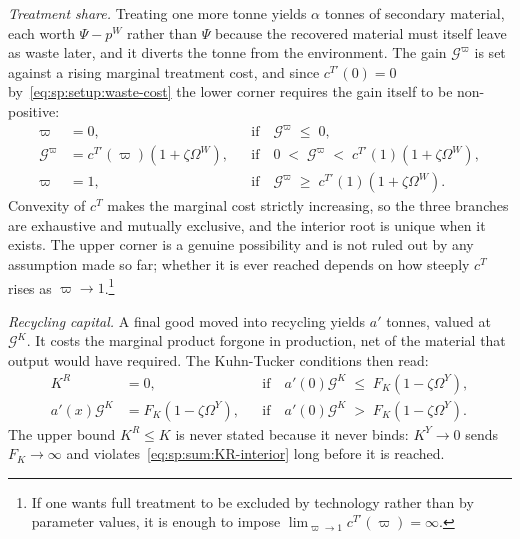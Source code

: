 \emph{Treatment share.} Treating one more tonne yields $\alpha$ tonnes of secondary material, each
worth $\Psi-p^W$ rather than $\Psi$ because the recovered material must itself leave as waste later,
and it diverts the tonne from the environment. The gain $\mathcal G^\varpi$ is set against a rising
marginal treatment cost, and since $c^{T\prime}\left(0\right)=0$ by~\eqref{eq:sp:setup:waste-cost} the
lower corner requires the gain itself to be non-positive:
\begin{subequations}
\label{eq:sp:sum:varpi}
\begin{align}
\varpi &= 0,
&&\text{if}\quad \mathcal G^{\varpi} \;\le\; 0,
\label{eq:sp:sum:varpi-lower}
\\
\mathcal G^{\varpi} &= c^{T\prime}\left(\varpi\right)\left(1+\zeta\Omega^W\right),
&&\text{if}\quad 0 \;<\; \mathcal G^{\varpi} \;<\; c^{T\prime}\left(1\right)\left(1+\zeta\Omega^W\right),
\label{eq:sp:sum:varpi-interior}
\\
\varpi &= 1,
&&\text{if}\quad \mathcal G^{\varpi} \;\ge\; c^{T\prime}\left(1\right)\left(1+\zeta\Omega^W\right).
\label{eq:sp:sum:varpi-upper}
\end{align}
\end{subequations}
Convexity of $c^T$ makes the marginal cost strictly increasing, so the three branches are exhaustive
and mutually exclusive, and the interior root is unique when it exists. The upper corner is a genuine possibility and is not ruled out by any
assumption made so far; whether it is ever reached depends on how steeply $c^T$ rises as
$\varpi\to1$.\footnote{If one wants full treatment to be excluded by technology rather than by
parameter values, it is enough to impose $\lim_{\varpi\to1}c^{T\prime}\left(\varpi\right)=\infty$.}

\emph{Recycling capital.} A final good moved into recycling yields $a'$ tonnes, valued at $\mathcal G^K$. It costs the marginal product forgone in production, net
of the material that output would have required. The Kuhn-Tucker conditions then read:
\begin{subequations}
\label{eq:sp:sum:KR}
\begin{align}
K^R &= 0,
&&\text{if}\quad a'\!\left(0\right)\mathcal G^{K} \;\le\; F_K\left(1-\zeta\Omega^Y\right),
\label{eq:sp:sum:KR-corner}
\\
a'\!\left(x\right)\mathcal G^{K} &= F_K\left(1-\zeta\Omega^Y\right),
&&\text{if}\quad a'\!\left(0\right)\mathcal G^{K} \;>\; F_K\left(1-\zeta\Omega^Y\right).
\label{eq:sp:sum:KR-interior}
\end{align}
\end{subequations}
The upper bound $K^R\le K$ is
never stated because it never binds: $K^Y\to0$ sends $F_K\to\infty$ and
violates~\eqref{eq:sp:sum:KR-interior} long before it is reached.

